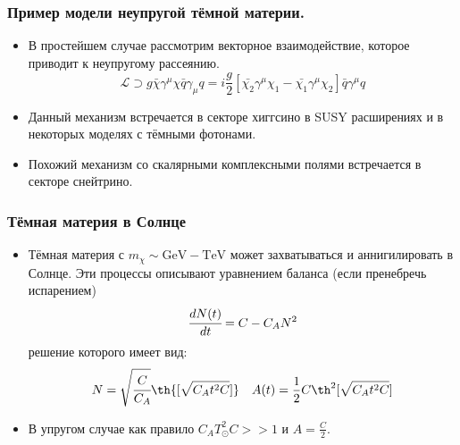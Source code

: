 \documentclass[
11pt,]{beamer}
\newcommand{\tderiv}[1]{\cfrac{d #1}{d t}}
\begin{document}
	\begin{frame}
		\frametitle{Пример модели неупругой тёмной материи.}
		\begin{itemize}
	\item В простейшем случае рассмотрим векторное взаимодействие, которое приводит к неупругому рассеянию.
	\begin{equation*} 
		\mathcal{L} \supset g\bar{\chi}\gamma^{\mu}\chi \bar{q}\gamma_{\mu}q = i\frac{g}{2}
		\left[ \bar{\chi_2}\gamma^{\mu}\chi_1  -  \bar{\chi_1}\gamma^{\mu}\chi_2\right]\bar{q}\gamma^{\mu}q
	\end{equation*}  
	\item Данный механизм встречается в секторе хиггсино в SUSY расширениях и в некоторых моделях с тёмными фотонами.
	\item Похожий механизм со скалярными комплексными полями встречается в секторе снейтрино.
\end{itemize}
	\end{frame}
	
	
	\begin{frame}
		\frametitle{Тёмная материя в Солнце}
		\begin{itemize}
	\item Тёмная материя с $m_{\chi} \sim \text{GeV} -\text{TeV} $ может захватываться и аннигилировать в Солнце. Эти процессы описывают уравнением баланса (если пренебречь испарением)
	\begin{equation*}
		\tderiv{N(t)} = C - C_A N^2
	\end{equation*}
	решение которого имеет вид:
	\begin{equation*}
		N = \sqrt{\cfrac{C}{C_A}} \th{[\sqrt{C_A t^2C}]} \quad
		A(t) = \frac{1}{2} C \th^2{[\sqrt{C_A t^2C}]}
		\label{eq:AnnNtherm}
	\end{equation*}
	
	\item  В упругом случае как правило $C_AT_{\odot}^2C >> 1$ и $A = \frac{C}{2}$. 
\end{itemize}
	\end{frame}
	
\end{document}

